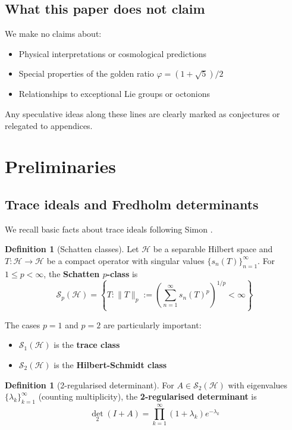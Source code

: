 \documentclass[11pt,a4paper]{article}
\theoremstyle{definition}
\newtheorem{definition}[theorem]{Definition}
\theoremstyle{remark}
\newcommand{\calS}{\mathcal{S}}
\newcommand{\calH}{\mathcal{H}}
\begin{document}
\subsection{What this paper does not claim}

We make no claims about:
\begin{itemize}
\item Physical interpretations or cosmological predictions
\item Special properties of the golden ratio $\varphi = (1+\sqrt{5})/2$
\item Relationships to exceptional Lie groups or octonions
\end{itemize}

Any speculative ideas along these lines are clearly marked as conjectures or 
relegated to appendices.

\section{Preliminaries}\label{sec:prelim}

\subsection{Trace ideals and Fredholm determinants}

We recall basic facts about trace ideals following Simon \cite{SimonTrace2005}.

\begin{definition}[Schatten classes]
Let $\calH$ be a separable Hilbert space and $T: \calH \to \calH$ be a compact operator 
with singular values $\{s_n(T)\}_{n=1}^\infty$. For $1 \leq p < \infty$, the 
\textbf{Schatten $p$-class} is
\[
\calS_p(\calH) = \left\{ T : \|T\|_p := \left(\sum_{n=1}^\infty s_n(T)^p\right)^{1/p} < \infty \right\}
\]
\end{definition}

The cases $p = 1$ and $p = 2$ are particularly important:
\begin{itemize}
\item $\calS_1(\calH)$ is the \textbf{trace class}
\item $\calS_2(\calH)$ is the \textbf{Hilbert-Schmidt class}
\end{itemize}

\begin{definition}[2-regularised determinant]
For $A \in \calS_2(\calH)$ with eigenvalues $\{\lambda_k\}_{k=1}^\infty$ (counting 
multiplicity), the \textbf{2-regularised determinant} is
\[
\det_2(I + A) = \prod_{k=1}^\infty (1 + \lambda_k) e^{-\lambda_k}
\]
\end{definition}
\end{document}
